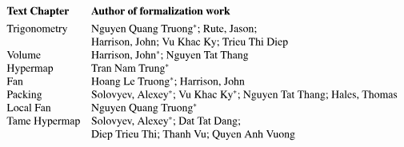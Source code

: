 \def\x#1{\text{#1}}

\[
\begin{array}{lll}
\x{\bf Text~Chapter} & \x{\bf Author~of~formalization~work}
\vspace{4pt}\\
\x{Trigonometry} & \x{Nguyen Quang Truong\ast; Rute, Jason;}
\\&\x{Harrison, John; Vu Khac Ky; Trieu Thi Diep}\\
\x{Volume} & \x{Harrison, John\ast; Nguyen Tat Thang}\\
\x{Hypermap} &  \x{Tran Nam Trung}\ast\\
\x{Fan} & \x{Hoang Le Truong\ast; Harrison, John}\\
\x{Packing} & \x{Solovyev, Alexey\ast; Vu Khac Ky\ast; Nguyen Tat Thang; Hales, Thomas}\\
\x{Local Fan} & \x{Nguyen Quang Truong\ast}\\
\x{Tame Hypermap} & \x{Solovyev, Alexey\ast; Dat Tat Dang;}\\
&\x{Diep Trieu Thi; Thanh Vu; Quyen Anh Vuong}
\end{array}
\]


\newpage